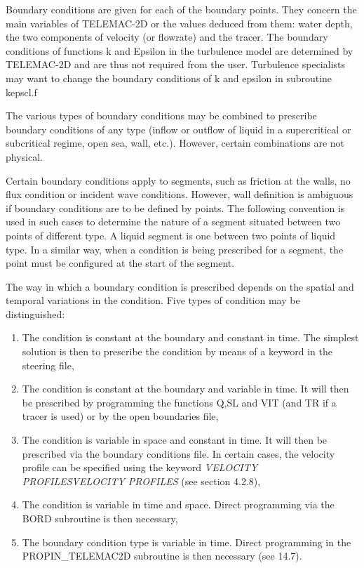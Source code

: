  Boundary conditions are given for each of the boundary points. They concern the main variables of TELEMAC-2D or the values deduced from them: water depth, the two components of velocity (or flowrate) and the tracer. The boundary conditions of functions k and Epsilon in the turbulence model are determined by TELEMAC-2D and are thus not required from the user. Turbulence specialists may want to change the boundary conditions of k and epsilon in subroutine kepscl.f

 The various types of boundary conditions may be combined to prescribe boundary conditions of any type (inflow or outflow of liquid in a supercritical or subcritical regime, open sea, wall, etc.). However, certain combinations are not physical.

 Certain boundary conditions apply to segments, such as friction at the walls, no flux condition or incident wave conditions. However, wall definition is ambiguous if boundary conditions are to be defined by points. The following convention is used in such cases to determine the nature of a segment situated between two points of different type. A liquid segment is one between two points of liquid type. In a similar way, when a condition is being prescribed for a segment, the point must be configured at the start of the segment.

 The way in which a boundary condition is prescribed depends on the spatial and temporal variations in the condition. Five types of condition may be distinguished:

\begin{enumerate}
\item  The condition is constant at the boundary and constant in time. The simplest solution is then to prescribe the condition by means of a keyword in the steering file,

\item  The condition is constant at the boundary and variable in time. It will then be prescribed by programming the functions Q,SL and VIT (and TR if a tracer is used) or by the open boundaries file,

\item  The condition is variable in space and constant in time. It will then be prescribed via the boundary conditions file. In certain cases, the velocity profile can be specified using the keyword \textit{VELOCITY PROFILESVELOCITY PROFILES} (see section 4.2.8),

\item  The condition is variable in time and space. Direct programming via the BORD subroutine is then necessary,

\item  The boundary condition type is variable in time. Direct programming in the PROPIN\_TELEMAC2D subroutine is then necessary (see 14.7).
\end{enumerate}

